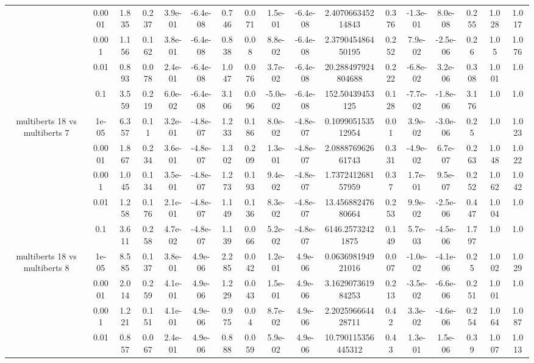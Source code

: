 \begin{tabular}{|c|c|c|c|c|c|c|c|c|c|c|c|c|c|c|c|c|}
 & 0.0001 & 1.835 & 0.237 & 3.9e-01 & -6.4e-08 & 0.746 & 0.071 & 1.5e-01 & -6.4e-08 & 2.407066345214843 & 0.376 & -1.3e-01 & 8.0e-08 & 0.255 & 1.028 & 1.017 \\
 & 0.001 & 1.156 & 0.162 & 3.8e-01 & -6.4e-08 & 0.838 & 0.08 & 8.8e-02 & -6.4e-08 & 2.379045486450195 & 0.252 & 7.9e-02 & -2.5e-06 & 0.26 & 1.05 & 1.076 \\
 & 0.01 & 0.893 & 0.078 & 2.4e-01 & -6.4e-08 & 1.047 & 0.076 & 3.7e-02 & -6.4e-08 & 20.288497924804688 & 0.222 & -6.8e-02 & 3.2e-06 & 0.308 & 1.001 & 1.0 \\
 & 0.1 & 3.559 & 0.219 & 6.0e-02 & -6.4e-08 & 3.106 & 0.096 & -5.0e-02 & -6.4e-08 & 152.50439453125 & 0.128 & -7.7e-02 & -1.8e-06 & 3.176 & 1.0 & 1.0 \\
\hline
\multirow{5}{*}{multiberts 18 vs multiberts 7} & 1e-05 & 6.357 & 0.11 & 3.2e-01 & -4.8e-07 & 1.233 & 0.186 & 8.0e-02 & -4.8e-07 & 0.109905153512954 & 0.01 & 3.9e-02 & -3.0e-06 & 0.25 & 1.0 & 1.023 \\
 & 0.0001 & 1.867 & 0.234 & 3.6e-01 & -4.8e-07 & 1.302 & 0.209 & 1.3e-01 & -4.8e-07 & 2.088876962661743 & 0.331 & -4.9e-02 & 6.7e-07 & 0.263 & 1.048 & 1.022 \\
 & 0.001 & 1.045 & 0.134 & 3.5e-01 & -4.8e-07 & 1.273 & 0.193 & 9.4e-02 & -4.8e-07 & 1.737241268157959 & 0.37 & 1.7e-01 & 9.5e-07 & 0.252 & 1.062 & 1.042 \\
 & 0.01 & 1.258 & 0.176 & 2.1e-01 & -4.8e-07 & 1.149 & 0.136 & 8.3e-02 & -4.8e-07 & 13.45688247680664 & 0.253 & 9.9e-02 & -2.5e-06 & 0.447 & 1.004 & 1.0 \\
 & 0.1 & 3.611 & 0.258 & 4.7e-02 & -4.8e-07 & 1.139 & 0.066 & 5.2e-02 & -4.8e-07 & 6146.25732421875 & 0.149 & 5.7e-03 & -4.5e-06 & 1.797 & 1.0 & 1.0 \\
\hline
\multirow{5}{*}{multiberts 18 vs multiberts 8} & 1e-05 & 8.585 & 0.137 & 3.8e-01 & 4.9e-06 & 2.285 & 0.042 & 1.2e-01 & 4.9e-06 & 0.063698194921016 & 0.007 & -1.0e-02 & -4.1e-06 & 0.25 & 1.002 & 1.029 \\
 & 0.0001 & 2.014 & 0.259 & 4.1e-01 & 4.9e-06 & 1.229 & 0.043 & 1.5e-01 & 4.9e-06 & 3.162907361984253 & 0.213 & -3.5e-02 & -6.6e-06 & 0.251 & 1.001 & 1.0 \\
 & 0.001 & 1.221 & 0.151 & 4.1e-01 & 4.9e-06 & 0.975 & 0.04 & 8.7e-02 & 4.9e-06 & 2.202596664428711 & 0.42 & 3.3e-02 & -4.6e-06 & 0.254 & 1.064 & 1.087 \\
 & 0.01 & 0.857 & 0.067 & 2.4e-01 & 4.9e-06 & 0.888 & 0.059 & 5.9e-02 & 4.9e-06 & 10.790115356445312 & 0.43 & 1.3e-01 & 1.5e-06 & 0.39 & 1.007 & 1.013 \\

\end{tabular}
